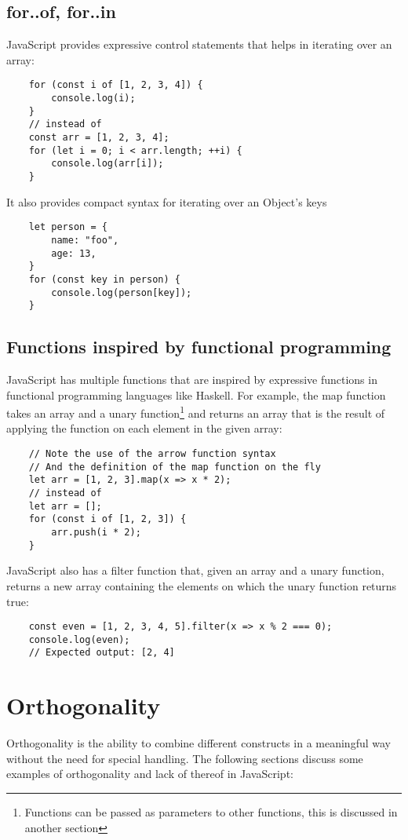 \documentclass[11pt,a4paper]{article}
\begin{document}
\subsection{\label{for_of_for_in}for..of, for..in}
JavaScript provides expressive control statements that helps in iterating over an array:
\begin{verbatim}
    for (const i of [1, 2, 3, 4]) {
        console.log(i);
    }
    // instead of
    const arr = [1, 2, 3, 4];
    for (let i = 0; i < arr.length; ++i) {
        console.log(arr[i]);
    }
\end{verbatim}
It also provides compact syntax for iterating over an Object's keys
\begin{verbatim}
    let person = {
        name: "foo",
        age: 13,
    }
    for (const key in person) {
        console.log(person[key]);
    }
\end{verbatim}

\subsection{\label{fp_functions}Functions inspired by functional programming}
JavaScript has multiple functions that are inspired by expressive functions in functional programming languages like
Haskell.
For example, the map function takes an array and a unary
function\footnote{Functions can be passed as parameters to other functions, this is discussed in another section}
and returns an array that is the result of applying the function on each element in the given array:
\begin{verbatim}
    // Note the use of the arrow function syntax
    // And the definition of the map function on the fly
    let arr = [1, 2, 3].map(x => x * 2);
    // instead of
    let arr = [];
    for (const i of [1, 2, 3]) {
        arr.push(i * 2);
    }
\end{verbatim}
JavaScript also has a filter function that, given an array and a unary function,
returns a new array containing the elements on which the unary function returns true:
\begin{verbatim}
    const even = [1, 2, 3, 4, 5].filter(x => x % 2 === 0);
    console.log(even);
    // Expected output: [2, 4]
\end{verbatim}

\section{Orthogonality}
Orthogonality is the ability to combine different constructs in a meaningful way without the need for special handling.
The following sections discuss some examples of orthogonality and lack of thereof in JavaScript:
\end{document}
